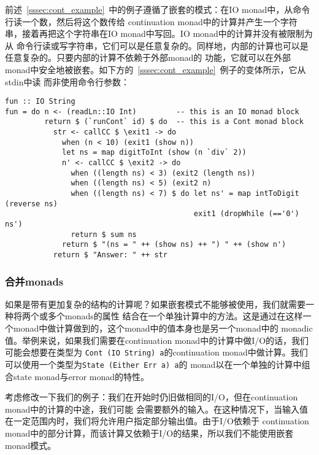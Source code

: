 \indent{}前述~\ref{sssec:cont_example}~中的例子遵循了嵌套的模式：在IO monad中，从命令行读一个数，然后将这个数传给
continuation monad中的计算并产生一个字符串，接着再把这个字符串在IO monad中写回。IO monad中的计算并没有被限制为从
命令行读或写字符串，它们可以是任意复杂的。同样地，内部的计算也可以是任意复杂的。只要内部的计算不依赖于外部monad的
功能，它就可以在外部monad中安全地被嵌套。如下方的~\ref{sssec:cont_example}~例子的变体所示，它从stdin中读
而非使用命令行参数：
\vspace{-0.5em}
\begin{verbatim}
fun :: IO String
fun = do n <- (readLn::IO Int)         -- this is an IO monad block
         return $ (`runCont` id) $ do  -- this is a Cont monad block
           str <- callCC $ \exit1 -> do
             when (n < 10) (exit1 (show n))
             let ns = map digitToInt (show (n `div` 2))
             n' <- callCC $ \exit2 -> do
               when ((length ns) < 3) (exit2 (length ns))
               when ((length ns) < 5) (exit2 n)
               when ((length ns) < 7) $ do let ns' = map intToDigit (reverse ns)
                                           exit1 (dropWhile (=='0') ns')
               return $ sum ns
             return $ "(ns = " ++ (show ns) ++ ") " ++ (show n')
           return $ "Answer: " ++ str
\end{verbatim}

\vspace{-0.8em}
\subsubsection{合并monads}\label{sssec:comb_monads_hard}
\indent{}如果是带有更加复杂的结构的计算呢？如果嵌套模式不能够被使用，我们就需要一种将两个或多个monads的属性
结合在一个单独计算中的方法。这是通过在这样一个monad中做计算做到的，这个monad中的值本身也是另一个monad中的
monadic值。举例来说，如果我们需要在continuation monad中的计算中做I/O的话，我们可能会想要在类型为
\texttt{Cont (IO String) a}的continuation monad中做计算。我们可以使用一个类型为\texttt{State (Either Err a) a}的
monad以在一个单独的计算中组合state monad与error monad的特性。

\indent{}考虑修改一下我们的例子：我们在开始时仍旧做相同的I/O，但在continuation monad中的计算的中途，我们可能
会需要额外的输入。在这种情况下，当输入值在一定范围内时，我们将允许用户指定部分输出值。由于I/O依赖于
continuation monad中的部分计算，而该计算又依赖于I/O的结果，所以我们不能使用嵌套monad模式。

